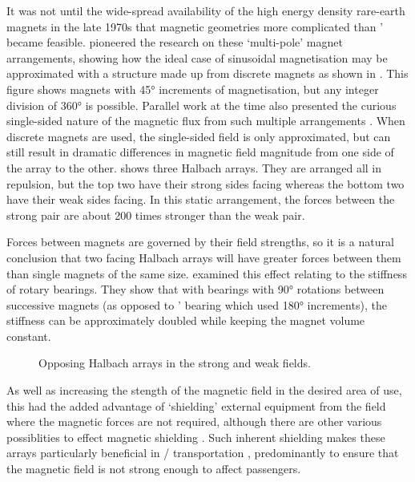 \documentclass[11pt,a4paper]{memoir}
\begin{document}
It was not until the wide-spread availability of the high energy
density rare-earth magnets in the late 1970s that magnetic
geometries more complicated than
\citeauthor{backers1961}' %
became feasible. \textcite{halbach1980} pioneered the research
on these `multi-pole' magnet arrangements, showing how the ideal
case of sinusoidal magnetisation may be approximated with a
structure made up from discrete magnets as shown in
.
This figure shows magnets with \ang{45} increments of magnetisation, but any integer division of \ang{360} is possible.
Parallel work at the time also presented the curious single-sided nature of the magnetic flux from such multiple arrangements \cite{shute2000-ietm}.
When discrete magnets are used, the single-sided field is only approximated, but can still result in dramatic differences in magnetic field magnitude from one side of the array to the other.
 shows three Halbach arrays.
They are arranged all in repulsion, but the top two have their strong sides facing whereas the bottom two have their weak sides facing.
In this static arrangement, the forces between the strong pair are about 200 times stronger than the weak pair.

Forces between magnets are governed by their field strengths, so
it is a natural conclusion that two facing Halbach arrays will
have greater forces between them than single magnets of the same
size. \textcite{yonnet1991} examined this effect relating to the
stiffness of rotary bearings. They show that with bearings with
\ang{90} rotations between successive magnets (as opposed to
\citeauthor{backers1961}' %
bearing which used \ang{180}
increments), the stiffness can be approximately doubled while
keeping the magnet volume constant.

\begin{figure}[htbp]
   \centering
   \caption{Opposing Halbach arrays in the strong and weak fields.}
\end{figure}

As well as increasing the stength of the magnetic field in the desired area of use, this had the added advantage of `shielding' external equipment from the field where the magnetic forces are not required, although there are other various possiblities to effect magnetic shielding \cite{becherini2009}.
Such inherent shielding makes these arrays particularly beneficial in \maglev/ transportation \cite{hoburg2004}, predominantly to ensure that the magnetic field is not strong enough to affect passengers.
\end{document}

